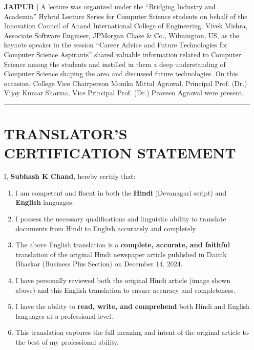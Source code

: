 \documentclass[12pt,letterpaper]{article}
\begin{document}
\noindent\textbf{JAIPUR} | A lecture was organized under the ``Bridging Industry and Academia'' Hybrid Lecture Series for Computer Science students on behalf of the Innovation Council of Anand International College of Engineering. Vivek Mishra, Associate Software Engineer, JPMorgan Chase \& Co., Wilmington, US, as the keynote speaker in the session ``Career Advice and Future Technologies for Computer Science Aspirants'' shared valuable information related to Computer Science among the students and instilled in them a deep understanding of Computer Science shaping the area and discussed future technologies. On this occasion, College Vice Chairperson Monika Mittal Agrawal, Principal Prof. (Dr.) Vijay Kumar Sharma, Vice Principal Prof. (Dr.) Praveen Agrawal were present.

\vspace{1cm}

\noindent\rule{\textwidth}{1.5pt}

\section*{TRANSLATOR'S CERTIFICATION STATEMENT}

\noindent I, \textbf{Subhash K Chand}, hereby certify that:

\begin{enumerate}
    \item I am competent and fluent in both the \textbf{Hindi} (Devanagari script) and \textbf{English} languages.
    
    \item I possess the necessary qualifications and linguistic ability to translate documents from Hindi to English accurately and completely.
    
    \item The above English translation is a \textbf{complete, accurate, and faithful} translation of the original Hindi newspaper article published in Dainik Bhaskar (Business Plus Section) on December 14, 2024.
    
    \item I have personally reviewed both the original Hindi article (image shown above) and this English translation to ensure accuracy and completeness.
    
    \item I have the ability to \textbf{read, write, and comprehend} both Hindi and English languages at a professional level.
    
    \item This translation captures the full meaning and intent of the original article to the best of my professional ability.
\end{enumerate}
\end{document}
